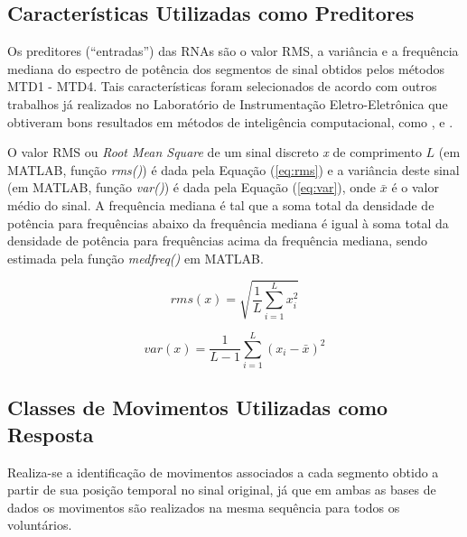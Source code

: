 

			\subsection{Características Utilizadas como Preditores}
Os preditores (``entradas'') das RNAs são o valor RMS, a variância e a frequência mediana do espectro de potência dos segmentos de sinal obtidos pelos métodos MTD1 - MTD4. Tais características foram selecionados de acordo com outros trabalhos já realizados no Laboratório de Instrumentação Eletro-Eletrônica que obtiveram bons resultados em métodos de inteligência computacional, como \cite{Favieiro2009}, \cite{Schons2014} e \cite{Cene2015}.

O valor RMS ou \emph{Root Mean Square} de um sinal discreto \emph{x} de comprimento $L$ (em MATLAB, função \emph{rms()}) é dada pela Equação (\ref{eq:rms}) e a variância deste sinal (em MATLAB, função \emph{var()}) é dada pela Equação (\ref{eq:var}), onde $\bar{x}$ é o valor médio do sinal. A frequência mediana é tal que a soma total da densidade de potência para frequências abaixo da frequência mediana é igual à soma total da densidade de potência para frequências acima da frequência mediana, sendo estimada pela função \emph{medfreq()} em MATLAB.

\begin{equation}
	\label{eq:rms}
	rms(x) = \sqrt{\frac{1}{L}\sum\limits_{i=1}^{L}x_i^2} 
\end{equation}

\begin{equation}
	\label{eq:var}
	var(x) = \frac{1}{L-1}\sum\limits_{i=1}^{L}(x_i - \bar{x})^2
\end{equation}

			\subsection{Classes de Movimentos Utilizadas como Resposta}
Realiza-se a identificação de movimentos associados a cada segmento obtido a partir de sua posição temporal no sinal original, já que em ambas as bases de dados os movimentos são realizados na mesma sequência para todos os voluntários.

